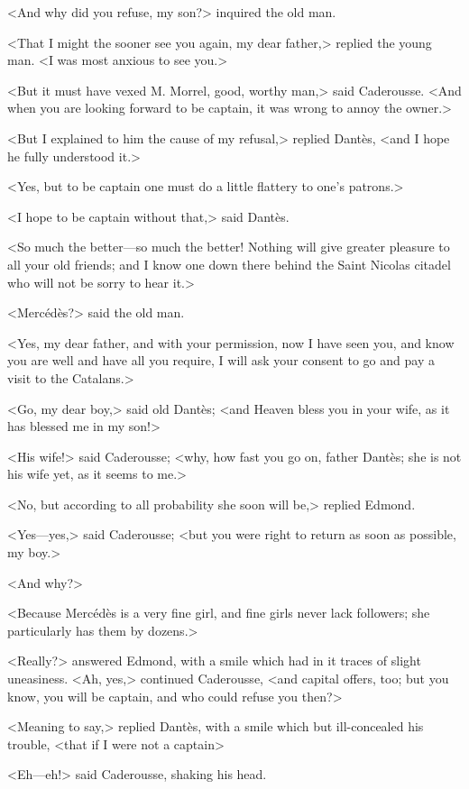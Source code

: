  <And why did you refuse, my son?> inquired the old man. 

 <That I might the sooner see you again, my dear father,> replied the young man. <I was most anxious to see you.> 

 <But it must have vexed M. Morrel, good, worthy man,> said Caderousse. <And when you are looking forward to be captain, it was wrong to annoy the owner.> 

 <But I explained to him the cause of my refusal,> replied Dantès, <and I hope he fully understood it.> 

 <Yes, but to be captain one must do a little flattery to one's patrons.> 

 <I hope to be captain without that,> said Dantès. 

 <So much the better—so much the better! Nothing will give greater pleasure to all your old friends; and I know one down there behind the Saint Nicolas citadel who will not be sorry to hear it.> 

 <Mercédès?> said the old man. 

 <Yes, my dear father, and with your permission, now I have seen you, and know you are well and have all you require, I will ask your consent to go and pay a visit to the Catalans.> 

 <Go, my dear boy,> said old Dantès; <and Heaven bless you in your wife, as it has blessed me in my son!> 

 <His wife!> said Caderousse; <why, how fast you go on, father Dantès; she is not his wife yet, as it seems to me.> 

 <No, but according to all probability she soon will be,> replied Edmond. 

 <Yes—yes,> said Caderousse; <but you were right to return as soon as possible, my boy.> 

 <And why?> 

 <Because Mercédès is a very fine girl, and fine girls never lack followers; she particularly has them by dozens.> 

 <Really?> answered Edmond, with a smile which had in it traces of slight uneasiness.  <Ah, yes,> continued Caderousse, <and capital offers, too; but you know, you will be captain, and who could refuse you then?> 

 <Meaning to say,> replied Dantès, with a smile which but ill-concealed his trouble, <that if I were not a captain\longdash> 

 <Eh—eh!> said Caderousse, shaking his head. 


